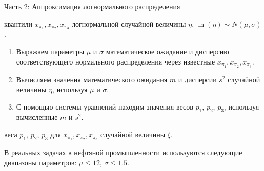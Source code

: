\documentclass[ucs, notheorems, handout]{beamer}
\newenvironment{pr1}{\par\noindent{\bf Дано:}}{}
\newenvironment{pr3}{\par\noindent{\bf Результат:}}{}
\begin{document}
	\begin{frame}{Часть 2: Аппроксимация логнормального распределения}
		\begin{pr1}
			квантили $x_{\pi_{1}}, x_{\pi_{2}}, x_{\pi_{3}}$ логнормальной случайной величины $\eta$, $\ln(\eta) \sim N(\mu, \sigma)$.
		\end{pr1}
		
		\bigskip
		
		\begin{enumerate}
			\item Выражаем параметры $\mu$ и $\sigma$ математическое ожидание и дисперсию соответствующего нормального распределения через известные $x_{\pi_{1}}, x_{\pi_{2}}, x_{\pi_{3}}$.
			\medskip
			\item Вычисляем значения математического ожидания $m$ и дисперсии $s^{2}$ случайной величины $\eta$, используя $\mu$ и $\sigma$.
			\medskip
			\item С помощью системы уравнений находим значения весов $p_{1}$, $p_{2}$, $p_{3}$, используя вычисленные $m$ и $s^{2}$.
		\end{enumerate}
		\bigskip
		\begin{pr3}\end{pr3} веса $p_{1}$, $p_{2}$, $p_{3}$ для $x_{\pi_{1}}, x_{\pi_{2}}, x_{\pi_{3}}$ случайной величины $\tilde{\xi}$.
		
		\medskip
		В реальных задачах в нефтяной промышленности используются следующие диапазоны
		параметров: $\mu \leq 12$, $\sigma \leq 1.5$.
		
	\end{frame}
	
\end{document}
